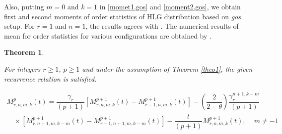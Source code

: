 \documentclass[11pt,a4paper]{article}
\numberwithin{equation}{section}
\newtheorem{theorem}{Theorem}[section]
\begin{document}
	

\noindent Also, putting $m=0$ and $k=1$ in \eqref{momet1.gos} and \eqref{moment2.gos}, we obtain first and second moments of order statistics of HLG distribution based on \textit{gos} setup. For $r=1$ and $n=1$, the results agrees with \cite{liu2020recurrence}. The numerical results of mean for order statistics for various configurations are obtained by \cite{liu2020recurrence}.

		

	\begin{theorem}\label{theo2}

		For integers $r\ge1$, $p\ge1$ and under the assumption of Theorem \ref{theo1}, the given recurrence relation is satisfied.

		\begin{eqnarray}\label{reccr.mgf}

			M_{r,n,m,k}^{p}(t)=\dfrac{{\gamma_{r}}}{(p+1)}\left[M_{r,n,m,k}^{p+1}(t)-M_{r-1,n,m,k}^{p+1}(t)\right]-\left(\dfrac{2}{2-\theta}\right)\dfrac{\gamma_{r}^{n+1,k-m}}{(p+1)}\nonumber \\ \,\,\,\,\,\, \times \left[M_{r,n+1,m,k-m}^{p+1}(t)-M_{r-1,n+1,m,k-m}^{p+1}(t)\right]- \dfrac{t}{(p+1)}M_{r,n,m,k}^{p+1}(t),\,\,\,\,\,\,\, m\ne-1\

		\end{eqnarray}

	\end{theorem}
\end{document}
